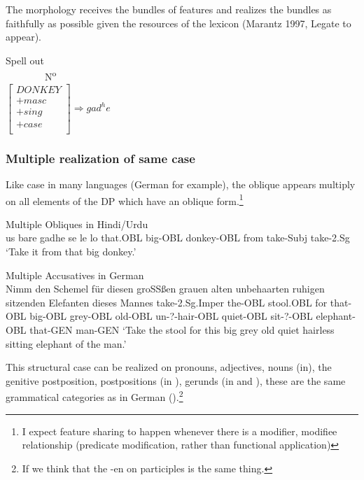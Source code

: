 \documentclass{article}
\begin{document}
The morphology receives the bundles of features and realizes the bundles as faithfully as possible given the resources of the lexicon (Marantz 1997, Legate to appear).

\begin{example}Spell out\\
~~~~~~~~N\textsuperscript{o}\\
$\left[ \begin{array}{l}
DONKEY\\
+masc\\
+sing\\
+case\\
\end{array} \right] \Rightarrow gad^he$
\end{example}

\subsubsection{Multiple realization of same case}

Like case in many languages (German for example), the oblique appears multiply on all elements of the DP which have an oblique form.\footnote{I expect feature sharing to happen whenever there is a modifier, modifiee relationship (predicate modification, rather than functional application)}


\begin{example}Multiple Obliques in Hindi/Urdu\\
\gll us   bare   gadhe   se  le lo
that.OBL  big-OBL  donkey-OBL  from   take-Subj  take-2.Sg
\glt`Take it  from  that  big donkey.'
\glend
\end{example}

\begin{example}Multiple Accusatives in German\\
\gll Nimm   den Schemel   f\"{u}r  diesen   groSSßen grauen  alten   unbehaarten   ruhigen sitzenden  Elefanten   dieses Mannes
take-2.Sg.Imper the-OBL stool.OBL  for  that-OBL  big-OBL grey-OBL  old-OBL  un-?-hair-OBL  quiet-OBL  sit-?-OBL  elephant-OBL    that-GEN man-GEN
\glt`Take  the stool for this big grey old quiet hairless sitting elephant of the man.'
\glend
\end{example}

This structural case can be realized on pronouns, adjectives, nouns (in),  the genitive postposition, postpositions (in ), gerunds (in  and ),  these are the same grammatical categories as in German ().\footnote{If we think that the -en on participles is the same thing.}
\end{document}
